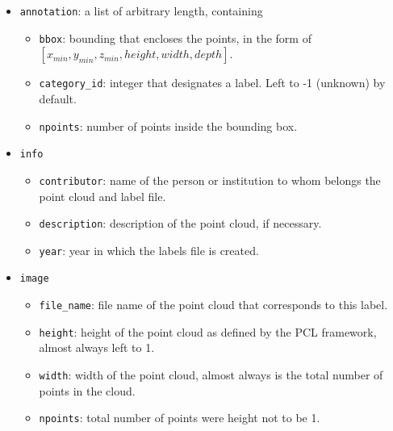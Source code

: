 \documentclass[../main.tex]{subfiles}
\begin{document}
\begin{itemize}
    \item \texttt{annotation}: a list of arbitrary length, containing
    \begin{itemize}
        \item \texttt{bbox}: bounding that encloses the points, in the form of \\$[x_{min}, y_{min}, z_{min}, height, width, depth]$.
        \item \texttt{category\_id}: integer that designates a label. Left to -1 (unknown) by default.
        \item \texttt{npoints}: number of points inside the bounding box.
    \end{itemize}
    \item \texttt{info}
    \begin{itemize}
        \item \texttt{contributor}: name of the person or institution to whom belongs the point cloud and label file.
        \item \texttt{description}: description of the point cloud, if necessary.
        \item \texttt{year}: year in which the labels file is created.
    \end{itemize}
    \item \texttt{image}
    \begin{itemize}
        \item \texttt{file\_name}: file name of the point cloud that corresponds to this label.
        \item \texttt{height}: height of the point cloud as defined by the PCL framework, almost always left to 1.
        \item \texttt{width}: width of the point cloud, almost always is the total number of points in the cloud.
        \item \texttt{npoints}: total number of points were height not to be 1.
    \end{itemize}
\end{itemize}
\end{document}
